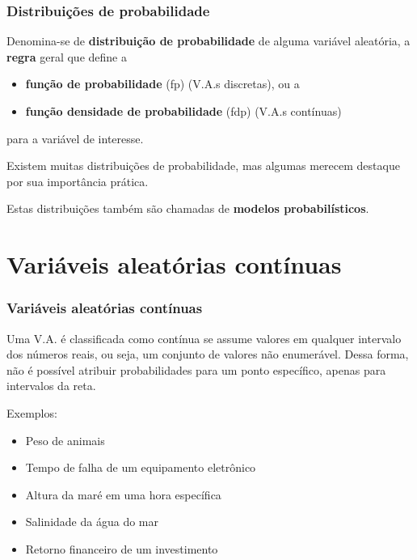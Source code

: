 \documentclass[11pt]{beamer}
\begin{document}
\begin{frame}
\frametitle{Distribuições de probabilidade}

Denomina-se de \textbf{distribuição de probabilidade} de alguma variável
aleatória, a \textbf{regra} geral que define a

\begin{itemize}
\item
  \textbf{função de probabilidade} (fp) (V.A.s discretas), ou a
\item
  \textbf{função densidade de probabilidade} (fdp) (V.A.s contínuas)
\end{itemize}

para a variável de interesse.

Existem muitas distribuições de probabilidade, mas algumas merecem
destaque por sua importância prática.

Estas distribuições também são chamadas de \textbf{modelos
probabilísticos}.
\end{frame}

\section{Variáveis aleatórias contínuas}
\begin{frame}
\frametitle{Variáveis aleatórias contínuas}

Uma V.A. é classificada como contínua se assume valores em qualquer
intervalo dos números reais, ou seja, um conjunto de valores não
enumerável. Dessa forma, não é possível atribuir probabilidades para um
ponto específico, apenas para intervalos da reta.

Exemplos:

\begin{itemize}
\item
  Peso de animais
\item
  Tempo de falha de um equipamento eletrônico
\item
  Altura da maré em uma hora específica
\item
  Salinidade da água do mar
\item
  Retorno financeiro de um investimento
\end{itemize}
\end{frame}
\end{document}

